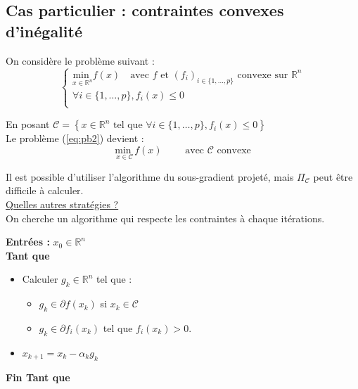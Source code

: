 \documentclass[12pt,a4paper]{article}
\begin{document}
\subsection{Cas particulier : contraintes convexes d'inégalité}

On considère le problème suivant :\\
\begin{equation}
    \begin{cases}
        \underset{x \in \mathbb{R}^n}{\text{min }} f(x) \quad \text{avec } f \text{ et } (f_i)_{i \in \{1, \dots, p\}} \text{ convexe sur } \mathbb{R}^n\\
        \forall i \in \{1, \dots, p\}, f_i(x) \leq 0\\
    \end{cases}
    \label{eq:pb2}
\end{equation}

En posant $\mathcal{C} = \left\{ x \in \mathbb{R}^n \text{ tel que } \forall i \in \{1, \dots, p\}, f_i(x) \leq 0 \right\}$\\

Le problème (\ref{eq:pb2}) devient :\\
\begin{equation}
    \underset{x \in \mathcal{C}}{\text{min }} f(x) \qquad \text{ avec } \mathcal{C} \text{ convexe}
    \label{eq:pb3}
\end{equation}

Il est possible d'utiliser l'algorithme du sous-gradient projeté, mais $\Pi_{\mathcal{C}}$ peut être difficile à calculer.\\

\noindent \underline{Quelles autres stratégies ?}\\
On cherche un algorithme qui respecte les contraintes à chaque itérations.\\

\begin{algorithm}
    \SetAlgoLined
    \textbf{Entrées :} $x_0 \in \mathbb{R}^n$\\
    \textbf{Tant que}\\
    \begin{itemize}
        \item Calculer $g_k \in \mathbb{R}^n$ tel que : \begin{itemize}
            \item $g_k \in \partial f(x_k)$ si $x_k \in \mathcal{C}$
            \item $g_k \in \partial f_i(x_k)$ tel que $f_i(x_k) > 0$.\\
            \end{itemize}
        \item $x_{k+1} = x_k - \alpha_k g_k$
        \end{itemize}
    \textbf{Fin Tant que}\\
\end{algorithm}
\end{document}
